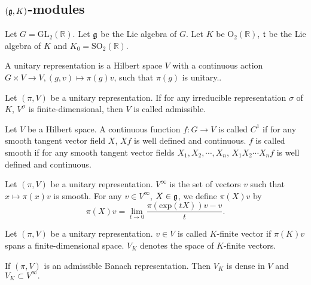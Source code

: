 \subsection{\texorpdfstring{$(\mathfrak g,K)$}{(g,k)}-modules}

Let $G=\mathrm{GL}_2 (\mathbb R)$. Let $\mathfrak g$ be the Lie algebra of $G$. Let $K$ be $\mathrm {O}_2(\mathbb R)$, $\mathfrak t$ be the Lie algebra of $K$ and $K_0=\mathrm {SO}_2(\mathbb R)$.

\begin{definition}
A unitary representation is a Hilbert space $V$ with a continuous action $G\times V\to V, (g,v)\mapsto \pi(g)v$,
such that $\pi(g)$ is unitary..
\end{definition}

\begin{definition}
Let $(\pi,V)$ be a unitary representation. If for any irreducible representation $\sigma$ of $K$, $V^{\sigma}$ is finite-dimensional, then $V$ is called admissible.
\end{definition}

\begin{definition}
Let $V$ be a Hilbert space. A continuous function $f\colon G\to V$ is called $C^1$ if for any smooth tangent vector field $X$, $Xf$ is well defined and continuous.
$f$ is called smooth if for any smooth tangent vector fields $X_1,X_2,\cdots, X_n$, $X_1X_2\cdots X_n f$ is well defined and continuous.
\end{definition}

\begin{definition}
Let $(\pi,V)$ be a unitary representation. $V^{\infty}$ is the set of vectors $v$ such that $x\mapsto \pi(x)v$ is smooth. For any $v\in V^\infty$, $X\in \mathfrak g$, we define $\pi(X)v$ by
\[
 \pi(X)v=\mathop{\mathrm {lim}}\limits_{t\to 0} \frac {\pi(\mathrm {exp} (tX)) v-v} t.
\]
\end{definition}

\begin{definition}
Let $(\pi,V)$ be a unitary representation. $v\in V$ is called $K$-finite vector if $\pi(K)v$ spans a finite-dimensional space. $V_K$ denotes the space of $K$-finite vectors.
\end{definition}

\begin{proposition}
If $(\pi,V)$ is an admissible Banach representation. Then $V_K$ is dense in $V$ and $V_K\subset V^\infty.$
\end{proposition}

